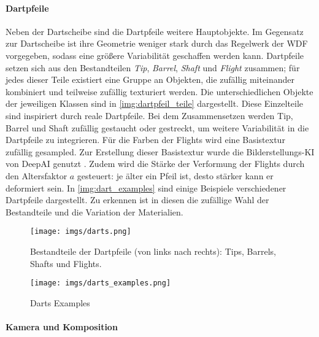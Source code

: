 \paragraph{Dartpfeile}
\label{sec:impl:daten:blender:hauptobjekte:dartpfeile}

Neben der Dartscheibe sind die Dartpfeile weitere Hauptobjekte. Im Gegensatz zur Dartscheibe ist ihre Geometrie weniger stark durch das Regelwerk der \ac{WDF} vorgegeben, sodass eine größere Variabilität geschaffen werden kann. Dartpfeile setzen sich aus den Bestandteilen \textit{Tip}, \textit{Barrel}, \textit{Shaft} und \textit{Flight} zusammen; für jedes dieser Teile existiert eine Gruppe an Objekten, die zufällig miteinander kombiniert und teilweise zufällig texturiert werden. Die unterschiedlichen Objekte der jeweiligen Klassen sind in \autoref{img:dartpfeil_teile} dargestellt. Diese Einzelteile sind inspiriert durch reale Dartpfeile. Bei dem Zusammensetzen werden Tip, Barrel und Shaft zufällig gestaucht oder gestreckt, um weitere Variabilität in die Dartpfeile zu integrieren. Für die Farben der Flights wird eine Basistextur zufällig gesampled. Zur Erstellung dieser Basistextur wurde die Bilderstellungs-KI von DeepAI genutzt \cite{deepai-image}. Zudem wird die Stärke der Verformung der Flights durch den Altersfaktor $a$ gesteuert: je älter ein Pfeil ist, desto stärker kann er deformiert sein. In \autoref{img:dart_examples} sind einige Beispiele verschiedener Dartpfeile dargestellt. Zu erkennen ist in diesen die zufällige Wahl der Bestandteile und die Variation der Materialien.

\begin{figure}
    \centering
    \texttt{[image: imgs/darts.png]}
    \caption{Bestandteile der Dartpfeile (von links nach rechts): Tips, Barrels, Shafts und Flights.}
    \label{img:dartpfeil_teile}
\end{figure}

\begin{figure}
    \centering
    \texttt{[image: imgs/darts\_examples.png]}
    \caption{Darts Examples}
    \label{img:dart_examples}
\end{figure}

\paragraph{Kamera und Komposition}
\label{sec:impl:daten:blender:hauptobjekte:kamera}

